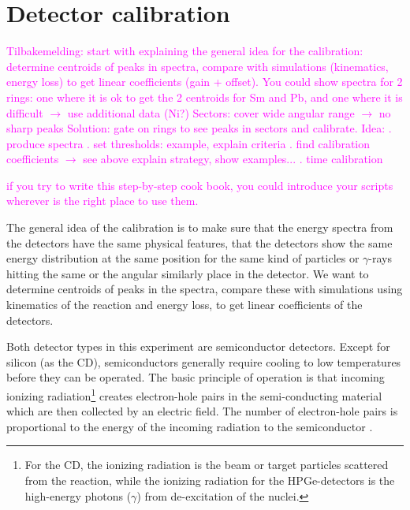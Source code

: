 \documentclass[twoside,english]{uiofysmaster/uiofysmaster}
\newcommand{\ga}{$\gamma$}
\begin{document}
\section{Detector calibration}


\textcolor{Magenta}{Tilbakemelding: \newline 
start with explaining the general idea for the calibration: \newline 
determine centroids of peaks in spectra, compare with simulations (kinematics, energy loss) to get linear coefficients (gain + offset). You could show spectra for 2 rings: one where it is ok to get the 2 centroids for Sm and Pb, and one where it is difficult $\rightarrow$ use additional data (Ni?) \newline
Sectors: cover wide angular range $\rightarrow$ no sharp peaks  \newline
Solution: gate on rings to see peaks in sectors and calibrate. \newline
Idea: . produce spectra . set thresholds: example, explain criteria . find calibration coefficients $\rightarrow$ see above \newline
explain strategy, show examples... . time calibration 
} \newline

\textcolor{Magenta}{ 
if you try to write this step-by-step cook book, you could introduce your scripts wherever is the right place to use them. 
}\newline

The general idea of the calibration is to make sure that the energy spectra from the detectors have the same physical features, that the detectors show the same energy distribution at the same position for the same kind of particles or \ga-rays hitting the same or the angular similarly place in the detector.
We want to determine centroids of peaks in the spectra, compare these with simulations using kinematics of the reaction and energy loss, to get linear coefficients of the detectors. 

Both detector types in this experiment are semiconductor detectors. 
Except for silicon (as the CD), semiconductors generally require cooling to low temperatures before they can be operated. 
The basic principle of operation is that incoming ionizing radiation\footnote{For the CD, the ionizing radiation is the beam or target particles scattered from the reaction, while the ionizing radiation for the HPGe-detectors is the high-energy photons (\ga) from de-excitation of the nuclei.} creates electron-hole pairs in the semi-conducting material which are then collected by an electric field. 
The number of electron-hole pairs is proportional to the energy of the incoming radiation to the semiconductor \cite{WRLeo}. 
\end{document}
